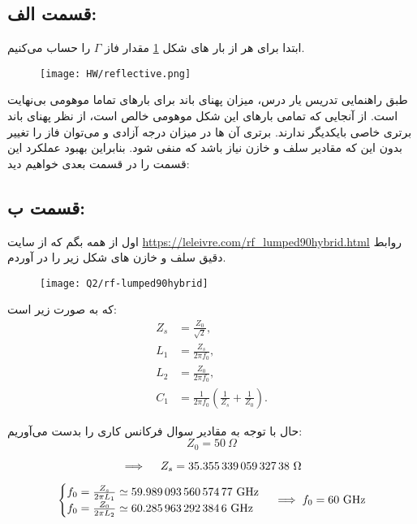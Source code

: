 \documentclass[12pt,onecolumn,a4paper]{article}
\begin{document}
\subsection{قسمت الف:}
ابتدا برای هر از بار های شکل 
	\ref{fig:reflective}
مقدار فاز $\Gamma$ را حساب می‌کنیم.


\begin{figure}[H]
	\centering
	\texttt{[image: HW/reflective.png]}
	\caption{}
	\label{fig:reflective}
\end{figure}

طبق راهنمایی تدریس یار درس، میزان پهنای باند برای بار‌های تماما موهومی بی‌نهایت است. از آنجایی که تمامی بارهای این شکل موهومی خالص است، از نظر پهنای باند برتری خاصی بایکدیگر ندارند. برتری آن ها در میزان درجه آزادی و می‌توان فاز را تغییر بدون این که مقادیر سلف و خازن نیاز باشد که منفی شود. بنابراین بهبود عملکرد این قسمت را در قسمت بعدی خواهیم دید:

\subsection{قسمت ب:}


اول از همه بگم که از سایت 
\url{https://leleivre.com/rf_lumped90hybrid.html}
روابط دقیق سلف و خازن های شکل زیر را در آوردم.


\begin{figure}[H]
	\centering
	\texttt{[image: Q2/rf-lumped90hybrid]}
	\caption{}
	\label{fig:rf-lumped90hybrid}
\end{figure}

که به صورت زیر است:
\begin{align}
	Z_s &= \frac{Z_0}{\sqrt{2}}, \\[10pt]
	L_1 &= \frac{Z_s}{2 \pi f_{0}}, \\[10pt]
	L_2 &= \frac{Z_0}{2 \pi f_{0}}, \\[10pt]
	C_1 &= \frac{1}{2 \pi f_{0}} \left( \frac{1}{Z_s} + \frac{1}{Z_0} \right).
\end{align}

حال با توجه به مقادیر سوال فرکانس کاری را بدست می‌آوریم:
\begin{equation}
	Z_0 = 50 \ \Omega
\end{equation}

\begin{equation}
	\implies \quad
	Z_s = \num{\fpeval{50 / sqrt(2)}} \ \Omega
\end{equation}


\begin{equation}
	\begin{cases}
		f_{0} = \frac{Z_s}{2 \pi L_1} \simeq \num{\fpeval{(50 / sqrt(2)) / (2 * pi * 93.8) * 1000}} \ \text{GHz}
		\\
		f_{0} = \frac{Z_0}{2 \pi L_2} \simeq \num{\fpeval{(50) / (2 * pi * 132) * 1000}} \ \text{GHz}
	\end{cases}
	\implies f_0 = 60 \ \text{GHz}
\end{equation}
\end{document}
